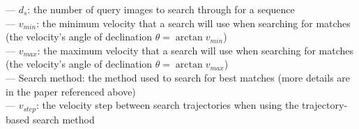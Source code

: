 \parbox{\textwidth}{--- $d_s$: the number of query images to search through for a sequence \\ --- $v_{min}$: the minimum velocity that a search will use when searching for matches (the velocity's angle of declination $\theta=\arctan{v_{min}}$) \\ --- $v_{max}$: the maximum velocity that a search will use when searching for matches (the velocity's angle of declination $\theta=\arctan{v_{max}}$) \\ --- Search method: the method used to search for best matches (more details are in the paper referenced above) \\ --- $v_{step}$: the velocity step between search trajectories when using the trajectory-based search method}
\smallskip
